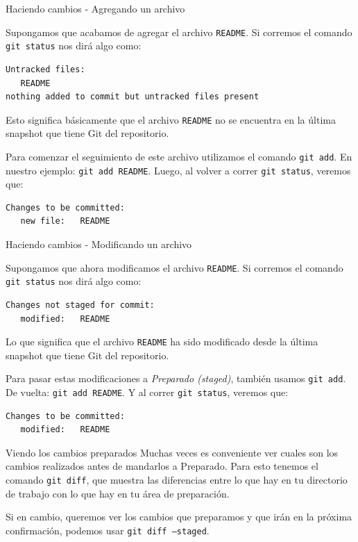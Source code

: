\documentclass{beamer}
\begin{document}
\begin{frame}[fragile]{Haciendo cambios - Agregando un archivo}

    Supongamos que acabamos de agregar el archivo \texttt{README}.
    Si corremos el comando \texttt{git status} nos dirá algo como:
    \begin{verbatim}
Untracked files:
   README
nothing added to commit but untracked files present
    \end{verbatim}
    Esto significa básicamente que el archivo \texttt{README} no se encuentra
    en la última snapshot que tiene Git del repositorio.

    Para comenzar el seguimiento de este archivo utilizamos el comando \texttt{git add}. En nuestro ejemplo: \texttt{git add README}.
    Luego, al volver a correr \texttt{git status}, veremos que:
    \begin{verbatim}
Changes to be committed:
   new file:   README
    \end{verbatim}

\end{frame}

\begin{frame}[fragile]{Haciendo cambios - Modificando un archivo}

    Supongamos que ahora modificamos el archivo \texttt{README}.
    Si corremos el comando \texttt{git status} nos dirá algo como:
    \begin{verbatim}
Changes not staged for commit:
   modified:   README
    \end{verbatim}
    Lo que significa que el archivo \texttt{README} ha sido modificado desde la última
    snapshot que tiene Git del repositorio.

    Para pasar estas modificaciones a \textit{Preparado (staged)}, también usamos \texttt{git add}. De vuelta: \texttt{git add README}.
    Y al correr \texttt{git status}, veremos que:
    \begin{verbatim}
Changes to be committed:
   modified:   README
    \end{verbatim}

\end{frame}

\begin{frame}[fragile]{Viendo los cambios preparados}
    Muchas veces es conveniente ver cuales son los cambios realizados antes de mandarlos a Preparado.
    Para esto tenemos el comando \texttt{git diff}, que muestra las diferencias entre lo que hay en
    tu directorio de trabajo con lo que hay en tu área de preparación.

    \vspace{1em}

    Si en cambio, queremos ver los cambios que preparamos y que irán en la próxima confirmación, podemos usar \texttt{git diff --staged}.

\end{frame}
\end{document}
